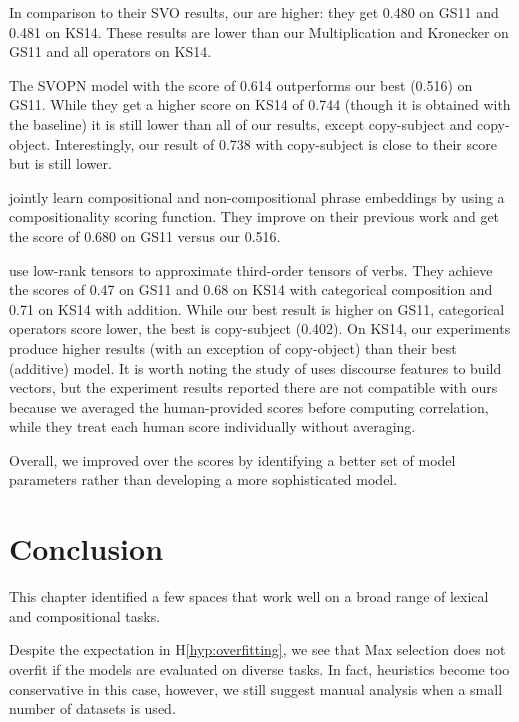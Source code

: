 In comparison to their SVO results, our are higher: they get 0.480 on GS11 and 0.481 on KS14. These results are lower than our Multiplication and Kronecker on GS11 and all operators on KS14.

The SVOPN model with the score of 0.614 outperforms our best (0.516) on GS11. While they get a higher score on KS14 of 0.744 (though it is obtained with the  baseline) it is still lower than all of our results, except copy-subject and copy-object. Interestingly, our result of 0.738 with copy-subject is close to their score but is still lower.

 jointly learn compositional and non-compositional phrase embeddings by using a compositionality scoring function. They improve on their previous work and get the score of 0.680 on GS11 versus our 0.516.

 use low-rank tensors to approximate third-order tensors of verbs. They achieve the scores of 0.47 on GS11 and 0.68 on KS14 with categorical composition and 0.71 on KS14 with addition. While our best result is higher on GS11, categorical operators score lower, the best is copy-subject (0.402). On KS14, our experiments produce higher results (with an exception of copy-object) than their best (additive) model. It is worth noting the study of  uses discourse features to build vectors, but the experiment results reported there are not compatible with ours because we averaged the human-provided scores before computing correlation, while they treat each human score individually without averaging.

Overall, we improved over the scores by identifying a better set of model parameters rather than developing a more sophisticated model.

\section{Conclusion}
\label{sec:conclusion-universal}

This chapter identified a few spaces that work well on a broad range of lexical and compositional tasks.

Despite the expectation in H\ref{hyp:overfitting}, we see that Max selection does not overfit if the models are evaluated on diverse tasks. In fact, heuristics become too conservative in this case, however, we still suggest manual analysis when a small number of datasets is used.

